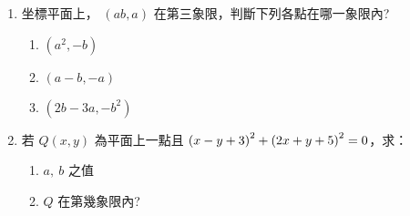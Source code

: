 \documentclass[bwprint,a4paper]{extarticle}
\begin{document}
\begin{observing}
	\begin{enumerate}
		\item 坐標平面上， $(ab,a)$ 在第三象限，判斷下列各點在哪一象限內?
			\begin{enumerate}[label=(\arabic*)]
				\item $(a^2,-b)$
				\item $(a-b,-a)$
				\item $(2b-3a,-b^2)$
			\end{enumerate}
		\item 若 $Q(x,y)$ 為平面上一點且 $\left(x-y+3\right)^2+\left(2x+y+5\right)^2=0$，求：
			\begin{enumerate}[label=(\arabic*)]
				\item $a,\ b$ 之值
				\item $Q$ 在第幾象限內?
			\end{enumerate}
	\end{enumerate}
\end{observing}
\vspace{30ex}
\end{document}
